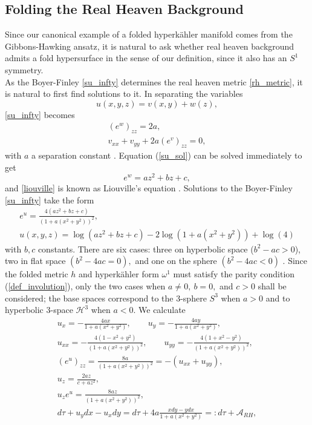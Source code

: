 \documentclass[a4paper,12pt, onecolumn, notitlepage]{article}
\theoremstyle{definition}
\theoremstyle{remark}
\newcommand{\w}{\omega}
\newcommand{\HK}{hyperk\"ahler }
\begin{document}
\subsection{Folding the Real Heaven Background}
Since our canonical example of a folded \HK manifold comes from the Gibbons-Hawking ansatz, it is natural to ask whether real heaven background admits a fold hypersurface in the sense of our definition, since it also has an $S^{1}$ symmetry.\\
As the Boyer-Finley \cref{su_infty} determines the real heaven metric \cref{rh_metric}, it is natural to first find solutions to it. In separating the variables
\begin{equation*}
	u(x,y,z) = v(x,y) + w(z),
\end{equation*}
\cref{su_infty} becomes
\begin{subequations}
	\begin{gather}
	\label{su_sol}
	(e^{w})_{zz} = 2a,\\
	\label{liouville}
	v_{xx} + v_{yy} + 2a(e^{v})_{zz}=0,
	\end{gather}
\end{subequations}
with $a$ a separation constant \cite{tod_1995}. Equation (\ref{su_sol}) can be solved immediately to get
\begin{equation}
	e^{w} = az^{2} + bz + c,
\end{equation}
and \cref{liouville} is known as Liouville's equation \cite{tod_1995}. Solutions to the Boyer-Finley \cref{su_infty} take the form
\begin{gather*}
	e^{u}=\frac{4(az^{2}+bz+c)}{(1+a(x^{2}+y^{2}))^{2}},\\
	u(x,y,z) = \log(az^{2}+bz+c)-2\log(1+a(x^{2}+y^{2})) +\log(4)
\end{gather*}
with $b,c$ constants. There are six cases: three on hyperbolic space ($b^{2}-ac>0$), two in flat space $(b^{2}-4ac=0),$ and one on the sphere $(b^{2}-4ac<0)$ \cite{tod_1995}. Since the folded metric $h$ and \HK form $\w^{1}$ must satisfy the parity condition (\ref{def_involution}), only the two cases when $a\neq 0,\ b=0,$ and $c>0$ shall be considered; the base spaces correspond to the 3-sphere $S^{3}$ when $a>0$ and to hyperbolic 3-space $\mathcal{H}^{3}$ when $a<0.$ We calculate
\begin{subequations}
	\begin{gather*}
	u_{x} = -\frac{4ax}{1+a(x^{2} + y^{2})}, \qquad u_{y} = -\frac{4ay}{1+a(x^{2} + y^{2})},\\
	u_{xx} = -\frac{4(1-x^{2}+y^{2})}{(1+a(x^{2} + y^{2}))^{2}},\qquad u_{yy} = -\frac{4(1+x^{2}-y^{2})}{(1+a(x^{2} + y^{2}))^{2}},\\
	(e^{u})_{zz} = \frac{8a}{(1+a(x^{2} + y^{2}))^{2}} = -(u_{xx} + u_{yy}),\\
	u_{z} = \frac{2az}{c+az^{2}},\\
	u_{z}e^{u} = \frac{8az}{(1+a(x^{2} + y^{2}))^{2}},\\
	d\tau + u_{y}dx-u_{x}dy = d\tau + 4a\frac{xdy-ydx}{1+a(x^{2} + y^{2})} =: d\tau + \mathcal{A}_{RH},
	\end{gather*}
\end{subequations}
\end{document}
